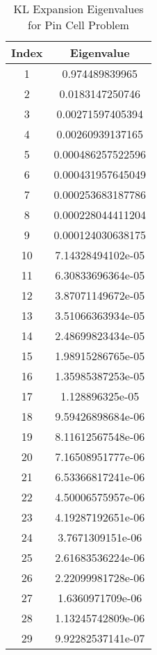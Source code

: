 \begin{table}[H]
  \centering
  \begin{tabular}{c|c}
Index & Eigenvalue \\ \hline
1 & 0.974489839965 \\
2 & 0.0183147250746 \\
3 & 0.00271597405394 \\
4 & 0.00260939137165 \\
5 & 0.000486257522596 \\
6 & 0.000431957645049 \\
7 & 0.000253683187786 \\
8 & 0.000228044411204 \\
9 & 0.000124030638175 \\
10 & 7.14328494102e-05 \\
11 & 6.30833696364e-05 \\
12 & 3.87071149672e-05 \\
13 & 3.51066363934e-05 \\
14 & 2.48699823434e-05 \\
15 & 1.98915286765e-05 \\
16 & 1.35985387253e-05 \\
17 & 1.128896325e-05 \\
18 & 9.59426898684e-06 \\
19 & 8.11612567548e-06 \\
20 & 7.16508951777e-06 \\
21 & 6.53366817241e-06 \\
22 & 4.50006575957e-06 \\
23 & 4.19287192651e-06 \\
24 & 3.7671309151e-06 \\
25 & 2.61683536224e-06 \\
26 & 2.22099981728e-06 \\
27 & 1.6360971709e-06 \\
28 & 1.13245742809e-06 \\
29 & 9.92282537141e-07
\end{tabular}
\caption{KL Expansion Eigenvalues for Pin Cell Problem}
\label{tab:pcarank}
\end{table}
